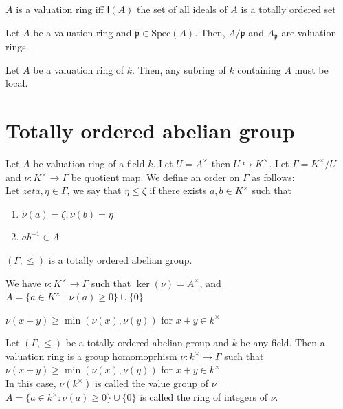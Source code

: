 \documentclass[oneside, 12pt]{scrbook}
\newcommand{\spec}{\mathrm{Spec}}
\newcommand{\pr}{\mathfrak{p}}
\theoremstyle{theorem}
\begin{document}
\begin{remark}
$A$ is a valuation ring iff $\mathsf{I}(A)$ the set of all ideals of $A$ is a totally ordered set
\end{remark}

\begin{corollary}
Let $A$ be a valuation ring and $\pr \in \spec(A)$. Then, $A/\pr$ and $A_{\pr}$ are valuation rings.
\end{corollary}

\begin{corollary}
Let $A$ be a valuation ring of $k$. Then, any subring of $k$ containing $A$ must be local. 
\end{corollary}

\section{Totally ordered abelian group}

Let $A$ be valuation ring of a field $k$. Let $U = A^{\times}$ then $ U\hookrightarrow K^{\times}$. Let $\Gamma = K^{\times}/U$ and $\nu: K^{\times} \rightarrow \Gamma$ be quotient map. We define an order on $\Gamma$ as follows: \\
Let $zeta, \eta \in \Gamma$, we say that $\eta \le \zeta$ if there exists $a,b \in K^{\times}$ such that 
\begin{enumerate}
\item $\nu(a)=\zeta, \nu(b)=\eta$
\item $ab^{-1} \in A$
\end{enumerate}

\begin{proposition}
$(\Gamma, \le)$ is a totally ordered abelian group.
\end{proposition}

We have $\nu : K^{\times} \rightarrow \Gamma$ such that $\ker (\nu) = A^{\times}$, and \\
$A = \{a \in K^{\times}\mid \nu(a) \geq 0\}\cup \{0\}$

\begin{exercise}
$\nu(x+y)\geq \min (\nu(x),\nu(y))$ for $x+y \in k^{\times}$
\end{exercise}

\begin{definition}
Let $(\Gamma, \le)$ be a totally ordered abelian group and $k$ be any field. Then a valuation ring is a group homomoprhism $\nu: k^{\times} \rightarrow \Gamma$ such that $\nu(x+y)\geq \min (\nu(x),\nu(y))$ for $x+y \in k^{\times}$ \\

In this case, $\nu(k^{\times})$ is called the value group of $\nu$ \\
$A= \{a \in k^{\times}: \nu(a) \geq 0\} \cup \{0\}$ is called the ring of integers of $\nu$.
\end{definition}
\end{document}
